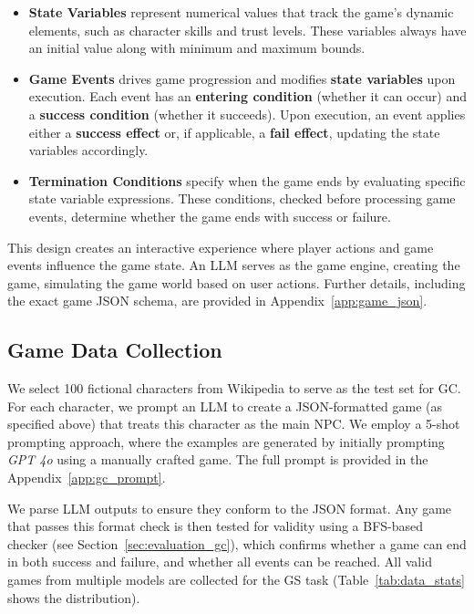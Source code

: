 \begin{itemize} 
    \item \textbf{State Variables} represent numerical values that track the game's dynamic elements, such as character skills and trust levels. These variables always have an initial value along with minimum and maximum bounds.
    \item \textbf{Game Events} drives game progression and modifies \textbf{state variables} upon execution. Each event has an \textbf{entering condition} (whether it can occur) and a \textbf{success condition} (whether it succeeds). Upon execution, an event applies either a \textbf{success effect} or, if applicable, a \textbf{fail effect}, updating the state variables accordingly.
    \item \textbf{Termination Conditions} specify when the game ends by evaluating specific state variable expressions. These conditions, checked before processing game events, determine whether the game ends with success or failure.
\end{itemize}

This design creates an interactive experience where player actions and game events influence the game state. An LLM serves as the game engine, creating the game, simulating the game world based on user actions. Further details, including the exact game JSON schema, are provided in Appendix~\ref{app:game_json}.



\subsection{Game Data Collection}\label{sec:gdc}

We select 100 fictional characters from Wikipedia to serve as the test set for GC. For each character, we prompt an LLM to create a JSON-formatted game (as specified above) that treats this character as the main NPC. We employ a 5-shot prompting approach, where the examples are generated by initially prompting \emph{GPT 4o} using a manually crafted game. The full prompt is provided in the Appendix~\ref{app:gc_prompt}.

We parse LLM outputs to ensure they conform to the JSON format. Any game that passes this format check is then tested for validity using a BFS-based checker (see Section~\ref{sec:evaluation_gc}), which confirms whether a game can end in both success and failure, and whether all events can be reached. All valid games from multiple models are collected for the GS task (Table~\ref{tab:data_stats} shows the distribution).

